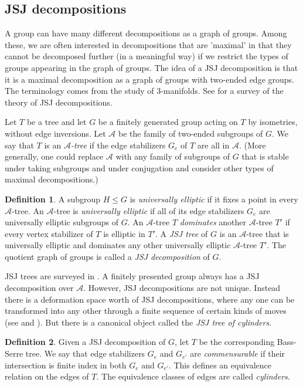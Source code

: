 \documentclass[10pt]{article}
\def\fancyA{\mathcal{A}}
\def\A{\mathcal{A}}
\theoremstyle{definition}
\newtheorem{definition}{Definition}
\begin{document}
\subsection{JSJ decompositions}
A group can have many different decompositions as a graph of groups. Among these, we are often interested in decompositions that are 'maximal' in  that they cannot be decomposed further (in a meaningful way) if we restrict the types of groups appearing in the graph of groups. The idea of a JSJ decomposition is that it is a maximal decomposition as a graph of groups with two-ended edge groups. The terminology comes from the study of 3-manifolds. See \cite{GL} for a survey of the theory of JSJ decompositions. 

    Let $T$ be a tree and let $G$ be a finitely generated group acting
on $T$ by isometries, without edge inversions. Let $\fancyA$ be the family of two-ended subgroups of $G$. We say that $T$ is an \textit{$\fancyA$-tree} if  the edge stabilizers $G_e$ of $T$ are all in $\fancyA$. (More generally, one could replace $\A$ with any family of subgroups of $G$ that is stable under taking subgroups and under conjugation and consider other types of maximal decompositions.)

\begin{definition}

A subgroup $H\leq G$ is \textit{universally elliptic} if it fixes a point in every $\A$-tree. An $\A$-tree is \textit{universally elliptic} if all of its edge stabilizers $G_e$ are universally elliptic subgroups of $G$. An $\A$-tree $T$ \textit{dominates} another $\A$-tree $T'$ if every vertex stabilizer of $T$ is elliptic in $T'$.  A \textit{JSJ tree} of $G$ is an $\A$-tree that is universally elliptic and dominates any other universally elliptic $\A$-tree $T'$. The quotient graph of groups is called a \textit{JSJ decomposition} of $G$. 

\end{definition}

JSJ trees are surveyed in \cite{GL}. A finitely presented group always has a JSJ decomposition over $\A$. However, JSJ decompositions are not unique. Instead there is a deformation space worth of JSJ decompositions, where any one can be transformed into any other through a finite sequence of certain kinds of moves (see \cite{ForDeform} and \cite{GL2}). But there is a canonical object called the \textit{JSJ tree of cylinders}. 

\begin{definition}
    Given a JSJ decomposition of $G$, let $T$ be the corresponding Bass-Serre tree. We say that edge stabilizers $G_e$ and $G_{e'}$ are \textit{commensurable} if their intersection is finite index in both $G_e$ and $G_{e'}$. This defines an equivalence relation on the edges of $T$. The equivalence classes of edges are called \textit{cylinders}. 
\end{definition}
\end{document}
